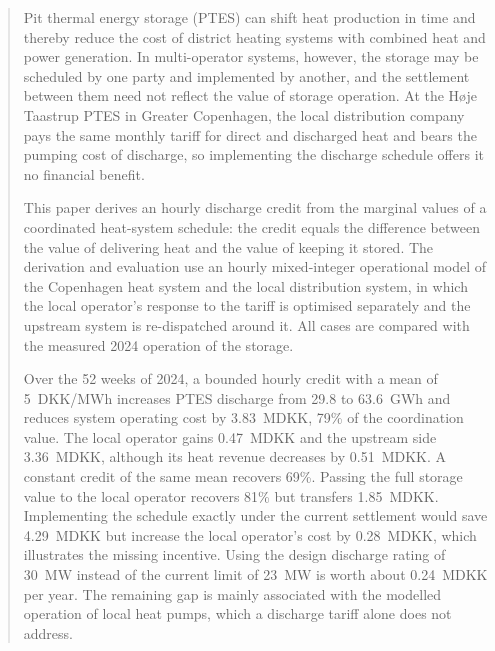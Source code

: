 \begin{abstract}
Pit thermal energy storage (PTES) can shift heat production in time and thereby reduce the cost of district heating systems with combined heat and power generation. In multi-operator systems, however, the storage may be scheduled by one party and implemented by another, and the settlement between them need not reflect the value of storage operation. At the Høje Taastrup PTES in Greater Copenhagen, the local distribution company pays the same monthly tariff for direct and discharged heat and bears the pumping cost of discharge, so implementing the discharge schedule offers it no financial benefit.

This paper derives an hourly discharge credit from the marginal values of a coordinated heat-system schedule: the credit equals the difference between the value of delivering heat and the value of keeping it stored. The derivation and evaluation use an hourly mixed-integer operational model of the Copenhagen heat system and the local distribution system, in which the local operator's response to the tariff is optimised separately and the upstream system is re-dispatched around it. All cases are compared with the measured 2024 operation of the storage.

Over the 52 weeks of 2024, a bounded hourly credit with a mean of 5~DKK/MWh increases PTES discharge from 29.8 to 63.6~GWh and reduces system operating cost by 3.83~MDKK, 79\% of the coordination value. The local operator gains 0.47~MDKK and the upstream side 3.36~MDKK, although its heat revenue decreases by 0.51~MDKK. A constant credit of the same mean recovers 69\%. Passing the full storage value to the local operator recovers 81\% but transfers 1.85~MDKK. Implementing the schedule exactly under the current settlement would save 4.29~MDKK but increase the local operator's cost by 0.28~MDKK, which illustrates the missing incentive. Using the design discharge rating of 30~MW instead of the current limit of 23~MW is worth about 0.24~MDKK per year. The remaining gap is mainly associated with the modelled operation of local heat pumps, which a discharge tariff alone does not address.
\end{abstract}

